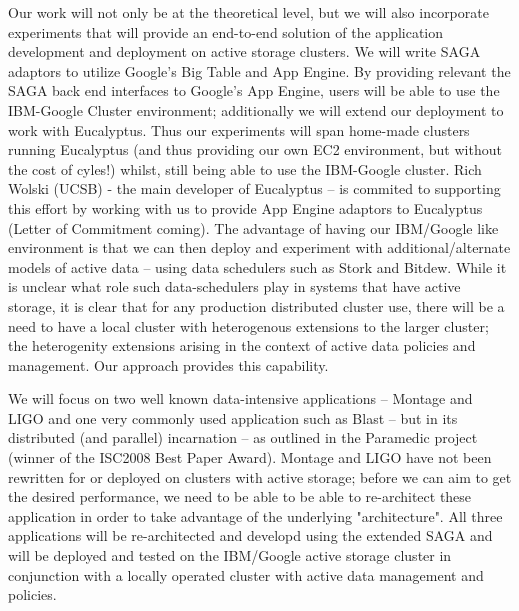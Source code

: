 \documentclass[10pt,letterpaper]{article}
\begin{document}
Our work will not only be at the theoretical level, but we will also
incorporate experiments that will provide an end-to-end solution of
the application development and deployment on active storage clusters.
We will write SAGA adaptors to utilize Google's Big Table and App Engine.
By providing relevant the SAGA back end interfaces to Google's App Engine, users will be able
to use the IBM-Google Cluster environment; additionally 
we will extend our deployment to work with Eucalyptus.
Thus our experiments will span home-made clusters running Eucalyptus
(and thus providing our own EC2 environment, but without the
cost of cyles!) whilst, still being able to use the IBM-Google cluster.
Rich Wolski (UCSB) - the main developer of Eucalyptus -- is commited to supporting this effort
by working with us to provide App Engine adaptors to Eucalyptus (Letter of
Commitment coming). The advantage
of having our IBM/Google like environment is that we can then 
deploy and experiment with additional/alternate models of active data
-- using data schedulers such as Stork and Bitdew. While it is unclear
what role such data-schedulers play in systems
that have active storage, it is clear that for any production distributed cluster use, there will be a 
need to have a local cluster with heterogenous extensions to the larger
cluster;  the heterogenity extensions arising in the context of active data policies and management.
Our approach provides this capability.

We will focus on two well known data-intensive applications -- Montage and LIGO  
and one very commonly used application such as Blast -- but in its distributed
(and parallel) incarnation -- as outlined in the Paramedic project (winner of the
ISC2008 Best Paper Award). Montage and LIGO have not
been rewritten for or deployed on clusters with active storage; before we can aim to get the
desired performance, we need to be able to be able to re-architect these
application in order to take advantage of the underlying "architecture". All three
applications will be re-architected and developd using the extended SAGA and will be
deployed and tested on the IBM/Google active storage cluster in conjunction with 
a locally operated cluster with active data management and policies.


 
\end{document}
